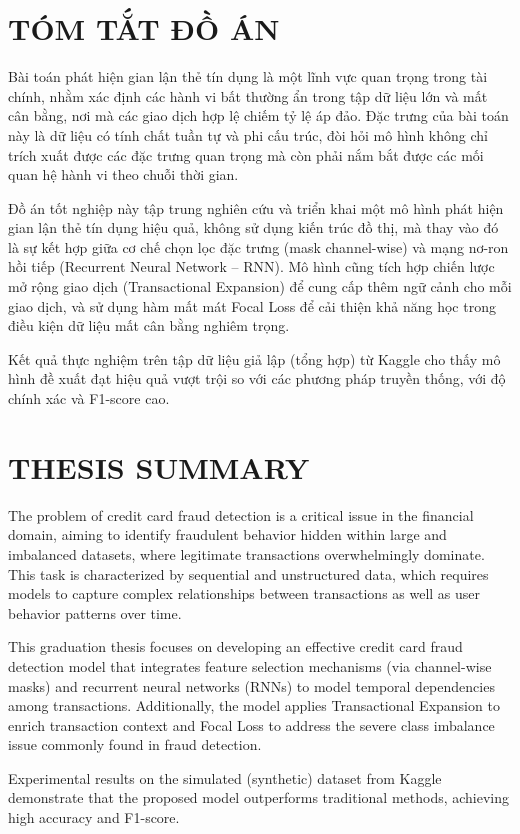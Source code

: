 \section*{TÓM TẮT ĐỒ ÁN}

Bài toán phát hiện gian lận thẻ tín dụng là một lĩnh vực quan trọng trong tài chính, nhằm xác định các hành vi bất thường ẩn trong tập dữ liệu lớn và mất cân bằng, nơi mà các giao dịch hợp lệ chiếm tỷ lệ áp đảo. Đặc trưng của bài toán này là dữ liệu có tính chất tuần tự và phi cấu trúc, đòi hỏi mô hình không chỉ trích xuất được các đặc trưng quan trọng mà còn phải nắm bắt được các mối quan hệ hành vi theo chuỗi thời gian.

Đồ án tốt nghiệp này tập trung nghiên cứu và triển khai một mô hình phát hiện gian lận thẻ tín dụng hiệu quả, không sử dụng kiến trúc đồ thị, mà thay vào đó là sự kết hợp giữa cơ chế chọn lọc đặc trưng (mask channel-wise) và mạng nơ-ron hồi tiếp (Recurrent Neural Network – RNN). Mô hình cũng tích hợp chiến lược mở rộng giao dịch (Transactional Expansion) để cung cấp thêm ngữ cảnh cho mỗi giao dịch, và sử dụng hàm mất mát Focal Loss để cải thiện khả năng học trong điều kiện dữ liệu mất cân bằng nghiêm trọng.

Kết quả thực nghiệm trên tập dữ liệu giả lập (tổng hợp) từ Kaggle cho thấy mô hình đề xuất đạt hiệu quả vượt trội so với các phương pháp truyền thống, với độ chính xác và F1-score cao. %


\newpage

\section*{THESIS SUMMARY}

The problem of credit card fraud detection is a critical issue in the financial domain, aiming to identify fraudulent behavior hidden within large and imbalanced datasets, where legitimate transactions overwhelmingly dominate. This task is characterized by sequential and unstructured data, which requires models to capture complex relationships between transactions as well as user behavior patterns over time.

This graduation thesis focuses on developing an effective credit card fraud detection model that integrates feature selection mechanisms (via channel-wise masks) and recurrent neural networks (RNNs) to model temporal dependencies among transactions. Additionally, the model applies Transactional Expansion to enrich transaction context and Focal Loss to address the severe class imbalance issue commonly found in fraud detection.

Experimental results on the simulated (synthetic) dataset from Kaggle demonstrate that the proposed model outperforms traditional methods, achieving high accuracy and F1-score. %